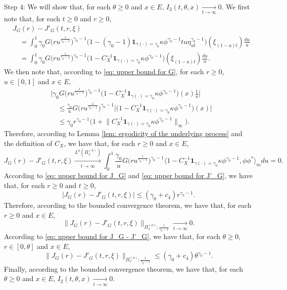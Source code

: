 \documentclass[12pt, a4paper]{amsart}
\theoremstyle{definition}
\numberwithin{equation}{section}
\begin{document}
	Step 4: We will show that, for each $\theta \geq 0$ and $x\in E$, $I_2(t,\theta,x) \xrightarrow[t\to \infty]{} 0$.
	We first note that, for each $t\geq 0$ and $r\geq 0$,
\[\begin{split}
	&J_G(r) - J'_G(t,r,\xi)
	\\&\quad = \int_0^1 \gamma_0 G\big( ru^{\frac{1}{\gamma_0 - 1}} \big) ^{\gamma_0 - 1} \big( 1- (\gamma_0 - 1) \mathbf 1_{\gamma(\cdot) = \gamma_0} \kappa \phi^{\gamma_0 - 1} tu\eta_{ut}^{\gamma_0 - 1} \big)(\xi_{(1-u)t}) \frac{du}{u}
	\\&\quad = \int_0^1 \gamma_0 G\big( ru^{\frac{1}{\gamma_0 - 1}} \big) ^{\gamma_0 - 1} \big( 1- C_X^{-1}\mathbf 1_{\gamma(\cdot) = \gamma_0} \kappa \phi^{\gamma_0 - 1} \big)(\xi_{(1-u)t}) \frac{du}{u}.
\end{split}\]
	We then note that, according to \eqref{eq: upper bound for G}, for each $r \geq 0$, $u\in [0,1]$ and $x\in E$,
\[\begin{split}
	&\big| \gamma_0 G\big( ru^{\frac{1}{\gamma_0 - 1}} \big) ^{\gamma_0 - 1} \big( 1- C_X^{-1}\mathbf 1_{\gamma(\cdot) = \gamma_0} \kappa \phi^{\gamma_0 - 1} \big)(x) \frac{1}{u} \big|
	\\&\quad \leq \frac{\gamma_0}{u} G\big( ru^{\frac{1}{\gamma_0 - 1}} \big) ^{\gamma_0 - 1} \big|\big( 1- C_X^{-1}\mathbf 1_{\gamma(\cdot) = \gamma_0} \kappa \phi^{\gamma_0 - 1} \big)(x) \big|
	\\&\quad \leq \gamma_0r^{\gamma_0 - 1} \big( 1+ \big\|C_X^{-1}\mathbf 1_{\gamma(\cdot) = \gamma_0} \kappa \phi^{\gamma_0 - 1} \big\|_\infty \big).
\end{split} \]
	Therefore, according to Lemma \ref{lem: ergodicity of the underlying process} and the definition of $C_X$, we have that, for each $r\geq 0$ and $x\in E$,
\[
	J_G(r) - J'_G(t,r,\xi)
	\xrightarrow[t\to \infty]{L^2(\Pi_x^{(\phi)})}
	\int_0^1 \frac{\gamma_0}{u} G\big( ru^{\frac{1}{\gamma_0 - 1}} \big) ^{\gamma_0 - 1} \big\langle 1- C_X^{-1}\mathbf 1_{\gamma(\cdot) = \gamma_0} \kappa \phi^{\gamma_0 - 1}, \phi\phi^*\big\rangle_m du
	=0.
\]
	According to \eqref{eq: upper bound for J_G} and \eqref{eq: upper bound for J'_G}, we have that, for each $r\geq 0$ and $t\geq 0$,
\[ \label{eq: upper bound for J_G - J'_G}
	\big| J_G(r) - J'_G(t,r,\xi)\big|
	\leq (\gamma_0 + c_4) r^{\gamma_0 - 1}.
\]
	Therefore, according to the bounded convergence theorem, we have that, for each $r\geq 0$ and $x\in E$,
\[
	 \big\|  J_G(r) - J'_G(t,r,\xi)  \big\|_{\Pi_x^{(\phi)};\frac{1}{\gamma_0 - 1}}
	 \xrightarrow[t\to \infty]{} 0.
\]
	According to \eqref{eq: upper bound for J_G - J'_G}, we have that, for each $\theta \geq 0$, $r\in [0,\theta]$ and $x\in E$,
\[
	\big\|  J_G(r) - J'_G(t,r,\xi)  \big\|_{\Pi_x^{(\phi)};\frac{1}{\gamma_0 - 1}}
	\leq (\gamma_0 + c_4) \theta^{\gamma_0 - 1}.
\]
	Finally, according to the bounded convergence theorem, we have that, for each $\theta\geq 0$ and $x\in E$, $I_2(t,\theta,x)\xrightarrow[t\to \infty]{} 0$.
	
\end{document}

